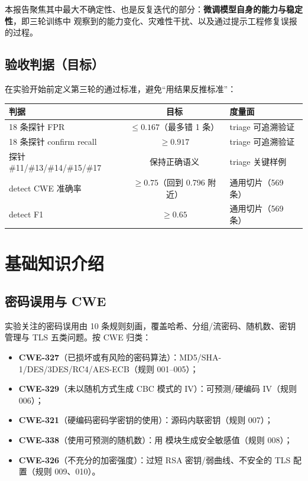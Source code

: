 \documentclass[11pt,a4paper,fontset=none]{ctexart}
\newcommand{\code}[1]{\begingroup\ttfamily\small\detokenize{#1}\endgroup}
\begin{document}
本报告聚焦其中最大不确定性、也是反复迭代的部分：\textbf{微调模型自身的能力与稳定性}，即三轮训练中
观察到的能力变化、灾难性干扰、以及通过提示工程修复误报的过程。

\subsection{验收判据（目标）}
在实验开始前定义第三轮的通过标准，避免“用结果反推标准”：

\begin{center}
\small
\begin{tabular}{@{}lcl@{}}
\toprule
判据 & 目标 & 度量面 \\
\midrule
18 条探针 FPR & $\le 0.167$（最多错 1 条） & triage 可追溯验证 \\
18 条探针 confirm recall & $\ge 0.917$ & triage 可追溯验证 \\
探针 \#11/\#13/\#14/\#15/\#17 & 保持正确语义 & triage 关键样例 \\
detect CWE 准确率 & $\ge 0.75$（回到 0.796 附近） & 通用切片（569 条） \\
detect F1 & $\ge 0.65$ & 通用切片（569 条） \\
\bottomrule
\end{tabular}
\end{center}

\section{基础知识介绍}
\label{sec:background}

\subsection{密码误用与 CWE}
实验关注的密码误用由 10 条规则刻画，覆盖哈希、分组/流密码、随机数、密钥管理与 TLS 五类问题。按
CWE 归类：

\begin{itemize}
  \item \textbf{CWE-327}（已损坏或有风险的密码算法）：MD5/SHA-1/DES/3DES/RC4/AES-ECB（规则 001--005）；
  \item \textbf{CWE-329}（未以随机方式生成 CBC 模式的 IV）：可预测/硬编码 IV（规则 006）；
  \item \textbf{CWE-321}（硬编码密码学密钥的使用）：源码内联密钥（规则 007）；
  \item \textbf{CWE-338}（使用可预测的随机数）：用 \code{random} 模块生成安全敏感值（规则 008）；
  \item \textbf{CWE-326}（不充分的加密强度）：过短 RSA 密钥/弱曲线、不安全的 TLS 配置（规则 009、010）。
\end{itemize}
\end{document}

